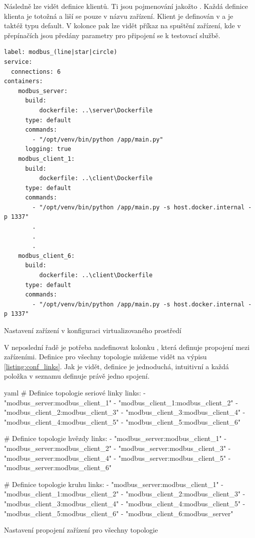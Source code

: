 Následně lze vidět definice klientů. Ti jsou pojmenování jakožto . Každá definice klienta je totožná a liší se pouze v názvu zařízení. Klient je definován v  a je taktéž typu default. V kolonce  pak lze vidět příkaz na spuštění zařízení, kde v přepínačích jsou předány parametry pro připojení se k testovací službě.


\begin{listing}[htbp]
    \centering
    \begin{verbatim}
label: modbus_(line|star|circle)
service:
  connections: 6
containers:
    modbus_server:
      build: 
          dockerfile: ..\server\Dockerfile
      type: default
      commands:
        - "/opt/venv/bin/python /app/main.py"
      logging: true
    modbus_client_1:
      build: 
          dockerfile: ..\client\Dockerfile
      type: default
      commands:
        - "/opt/venv/bin/python /app/main.py -s host.docker.internal -p 1337"
        .
        .
        .
    modbus_client_6:
      build: 
          dockerfile: ..\client\Dockerfile
      type: default
      commands:
        - "/opt/venv/bin/python /app/main.py -s host.docker.internal -p 1337"
    \end{verbatim}
\caption{Nastavení zařízení v konfiguraci virtualizovaného prostředí}
\label{listing:conf_devices}
\end{listing}

V neposlední řadě je potřeba nadefinovat kolonku , která definuje propojení mezi zařízeními. Definice pro všechny topologie můžeme vidět na výpisu \ref{listing:conf_links}. Jak je vidět, definice je jednoduchá, intuitivní a každá položka v seznamu definuje právě jedno spojení.

\begin{listing}[htbp]
    \centering
    \begin{cminted}[breaklines,autogobble, fontsize=\footnotesize]{yaml}
# Definice topologie seriové linky
links:
- "modbus_server:modbus_client_1"    
- "modbus_client_1:modbus_client_2"    
- "modbus_client_2:modbus_client_3"    
- "modbus_client_3:modbus_client_4"    
- "modbus_client_4:modbus_client_5"    
- "modbus_client_5:modbus_client_6"

# Definice topologie hvězdy
links:
- "modbus_server:modbus_client_1"    
- "modbus_server:modbus_client_2"    
- "modbus_server:modbus_client_3"    
- "modbus_server:modbus_client_4"    
- "modbus_server:modbus_client_5"    
- "modbus_server:modbus_client_6"

# Definice topologie kruhu
links:
- "modbus_server:modbus_client_1"    
- "modbus_client_1:modbus_client_2"    
- "modbus_client_2:modbus_client_3"    
- "modbus_client_3:modbus_client_4"    
- "modbus_client_4:modbus_client_5"    
- "modbus_client_5:modbus_client_6"
- "modbus_client_6:modbus_server"
    \end{cminted}
\caption{Nastavení propojení zařízení pro všechny topologie}
\label{listing:conf_links}
\end{listing}


